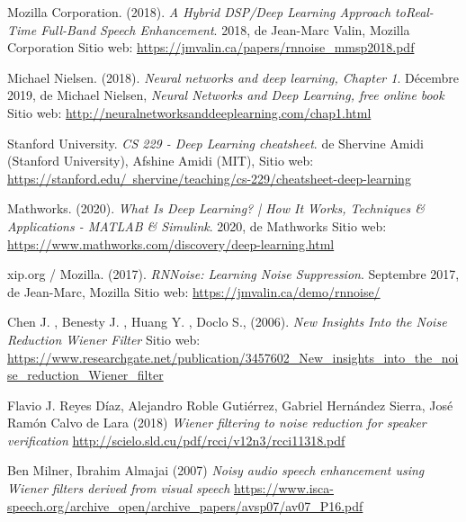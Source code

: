 \documentclass[conference,onecolumn]{IEEEtran}
\begin{document}
\begin{flushleft}
\begin{thebibliography}{100}
Mozilla Corporation. (2018). \textit{A Hybrid DSP/Deep Learning Approach toReal-Time Full-Band Speech Enhancement}. 2018, de Jean-Marc Valin, Mozilla Corporation  Sitio web: \href{https://jmvalin.ca/papers/rnnoise_mmsp2018.pdf}{https://jmvalin.ca/papers/rnnoise\_mmsp2018.pdf}

Michael Nielsen. (2018). \textit{Neural networks and deep learning, Chapter 1}. Décembre 2019, de Michael Nielsen, \textit{Neural Networks and Deep Learning, free online book}  Sitio web: \href{http://neuralnetworksanddeeplearning.com/chap1.html}{http://neuralnetworksanddeeplearning.com/chap1.html}

Stanford University. \textit{CS 229 - Deep Learning cheatsheet}. de Shervine Amidi (Stanford University), Afshine Amidi (MIT), Sitio web: \href{https://stanford.edu/~shervine/teaching/cs-229/cheatsheet-deep-learning}{https://stanford.edu/~shervine/teaching/cs-229/cheatsheet-deep-learning}

Mathworks. (2020). \textit{What Is Deep Learning? | How It  Works, Techniques \&  Applications - MATLAB \& Simulink}. 2020, de Mathworks Sitio web: \href{https://www.mathworks.com/discovery/deep-learning.html}{https://www.mathworks.com/discovery/deep-learning.html}

xip.org / Mozilla. (2017). \textit{RNNoise: Learning Noise Suppression}. Septembre 2017, de Jean-Marc, Mozilla Sitio web: \href{https://jmvalin.ca/demo/rnnoise/}{https://jmvalin.ca/demo/rnnoise/}

Chen J. , Benesty J. , Huang Y. , Doclo S., (2006). \textit{New Insights Into the Noise Reduction Wiener Filter }  Sitio web: 
\href{https://www.researchgate.net/publication/3457602_New_insights_into_the_noise_reduction_Wiener_filter}{https://www.researchgate.net/publication/3457602\_New\_insights\_into\_the\_noise\_reduction\_Wiener\_filter}

Flavio J. Reyes Díaz, Alejandro Roble Gutiérrez, Gabriel Hernández Sierra, José Ramón Calvo de Lara (2018) \textit{Wiener filtering to noise reduction for speaker verification} \href{http://scielo.sld.cu/pdf/rcci/v12n3/rcci11318.pdf}{http://scielo.sld.cu/pdf/rcci/v12n3/rcci11318.pdf}

Ben Milner, Ibrahim Almajai (2007) \textit{Noisy audio speech enhancement using Wiener filters derived from visual speech }
\href{https://www.isca-speech.org/archive_open/archive_papers/avsp07/av07_P16.pdf}{https://www.isca-speech.org/archive\_open/archive\_papers/avsp07/av07\_P16.pdf}


\end{thebibliography}
\end{flushleft}
\end{document}
